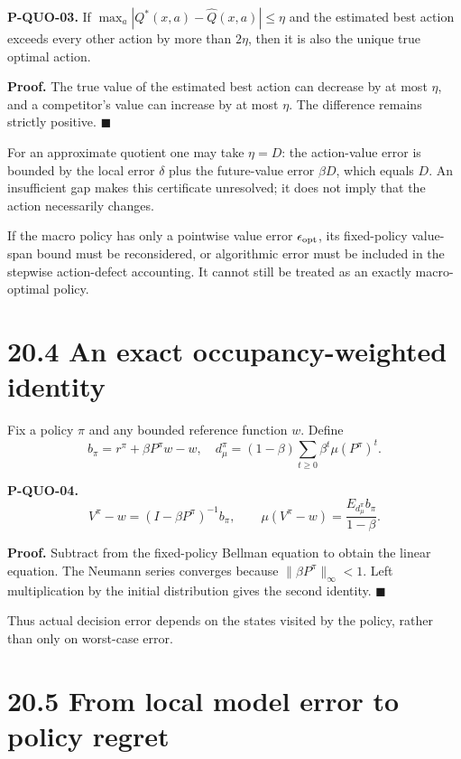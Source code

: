 \documentclass[
  english,
  11pt,
  oneside]{book}
\begin{document}
\hypertarget{p-quo-03}{}\label{p-quo-03}

\textbf{P-QUO-03.} If \(\max_a|Q^*(x,a)-\widehat Q(x,a)|\le\eta\) and the estimated best action exceeds every other action by more than \(2\eta\), then it is also the unique true optimal action.

\textbf{Proof.} The true value of the estimated best action can decrease by at most \(\eta\), and a competitor's value can increase by at most \(\eta\). The difference remains strictly positive. \(\blacksquare\)

For an approximate quotient one may take \(\eta=D\): the action-value error is bounded by the local error \(\delta\) plus the future-value error \(\beta D\), which equals \(D\). An insufficient gap makes this certificate unresolved; it does not imply that the action necessarily changes.

If the macro policy has only a pointwise value error \(\epsilon_{\rm opt}\), its fixed-policy value-span bound must be reconsidered, or algorithmic error must be included in the stepwise action-defect accounting. It cannot still be treated as an exactly macro-optimal policy.

\section{20.4 An exact occupancy-weighted identity}\label{an-exact-occupancy-weighted-identity}

Fix a policy \(\pi\) and any bounded reference function \(w\). Define \[b_\pi=r^\pi+\beta P^\pi w-w,\quad
d_{\mu}^\pi=(1-\beta)\sum_{t\ge0}\beta^t\mu(P^\pi)^t.\]

\hypertarget{p-quo-04}{}\label{p-quo-04}

\textbf{P-QUO-04.} \[V^\pi-w=(I-\beta P^\pi)^{-1}b_\pi,
\qquad
\mu(V^\pi-w)=\frac{E_{d_\mu^\pi}b_\pi}{1-\beta}.\]

\textbf{Proof.} Subtract from the fixed-policy Bellman equation to obtain the linear equation. The Neumann series converges because \(\|\beta P^\pi\|_\infty<1\). Left multiplication by the initial distribution gives the second identity. \(\blacksquare\)

Thus actual decision error depends on the states visited by the policy, rather than only on worst-case error.

\section{20.5 From local model error to policy regret}\label{from-local-model-error-to-policy-regret}
\end{document}

